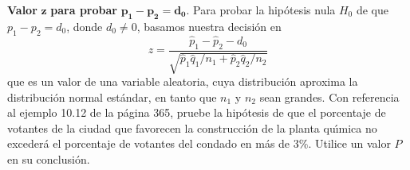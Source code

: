 \begin{enunciado}
 \textbf{Valor} $\mathbf{z}$ \textbf{para probar} $\mathbf{p_1 - p_2=d_0}$.
 Para probar la hip\'otesis nula $H_0$ de que $p_1 - p_2 = d_0$,
 donde $d_0 \neq 0$, basamos nuestra decisi\'on en
 \begin{equation*}
  z =
  \frac{\widehat{p}_1-\widehat{p}_2-d_0}{\sqrt{
  \widehat{p}_1\widehat{q}_1/n_1 + \widehat{p}_2\widehat{q}_2/n_2}}
 \end{equation*}
 que es un valor de una variable aleatoria,
 cuya distribuci\'on aproxima la distribuci\'on normal est\'andar,
 en tanto que $n_1$ y $n_2$ sean grandes.
 Con referencia al ejemplo 10.12 de la p\'agina 365,
 pruebe la hip\'otesis de que el porcentaje de votantes de la ciudad que favorecen la construcci\'on de la planta qu\'{\i}mica no exceder\'a el porcentaje de votantes del condado en m\'as de $3\%$.
 Utilice un valor $P$ en su conclusi\'on.
\end{enunciado}

